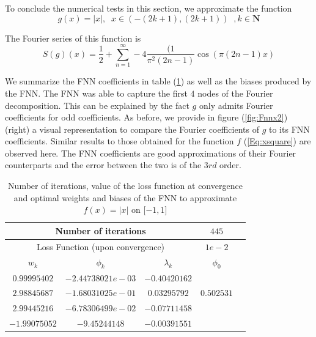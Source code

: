 \documentclass[AMS,STIX1COL]{WileyNJD-v2}
\begin{document}
To conclude the numerical tests in this section, we approximate the function
\begin{equation}\label{Eq:absx}
 g(x) = |x|, \;\; \text{$x \in \left(-(2k+1), (2k+1)\right)$}\;\;, k \in \mathbf{N}   
\end{equation}


The Fourier series of this function is
$$
S(g)(x)= \frac{1}{2} + \sum_{n=1}^{\infty} -4 \frac{(1}{\pi^2 (2n - 1)} \cos(\pi (2n - 1)x)
$$

We summarize the FNN coefficients in table (\ref{tab:tabfnnx2}) as well as the biases produced by the FNN. The FNN was able to capture the first $4$ nodes of the Fourier decomposition. This can be explained by the fact $g$ only admits Fourier coefficients for odd coefficients. As before, we provide in figure (\ref{fig:Fnnx2}) (right) a visual representation to compare the Fourier coefficients of $g$ to its FNN coefficients. Similar results to those obtained for the function $f$ (\ref{Eq:xsquare}) are observed here.  The FNN coefficients are good approximations of their Fourier counterparts and the error between the two is of the $3rd$ order.\\
\begin{table}[!h]
  \begin{center}
  \begin{tabular}{ |c|c|c|c|c| } 
    \hline
\multicolumn{3}{|c|}{Number of iterations}& $445$  \\
\hline
  \multicolumn{3}{|c|}{Loss Function (upon convergence)} & $1e-2$  \\
\hline
\hline
$w_k$ & $\phi_k$ & $\lambda_k$& $\phi_0$ \\
\hline
$ 0.99995402$ & $-2.44738021e-03$ &$-0.40420162$& \\ 
$2.98845687$&$-1.68031025e-01$ & $0.03295792$& $0.502531$ \\ 
$2.99445216$& $-6.78306499e-02$ & $-0.07711458$& \\ 
$ -1.99075052$& $-9.45244148$ & $ -0.00391551$& \\ 
\hline
\end{tabular}
\caption{\;Number of iterations, value of the loss function at convergence and optimal weights and biases of the FNN to approximate $ f(x) = |x|$ on $[-1, 1$]}\label{tab:tabfnnx2}
\end{center}
\end{table}
\end{document}

